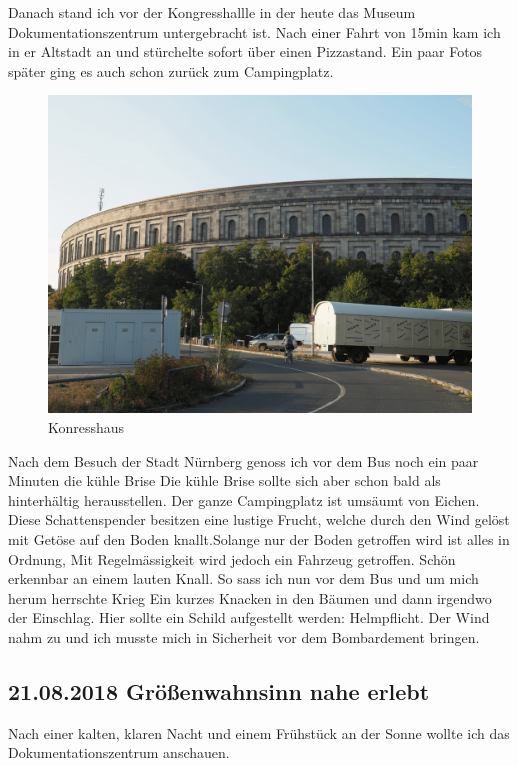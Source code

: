 \newpage

Danach stand ich vor der Kongresshallle in der heute das Museum \glqq Dokumentationszentrum\grqq{} untergebracht ist. 
Nach einer Fahrt von 15min kam ich in er Altstadt an und stürchelte sofort über einen Pizzastand.
Ein paar Fotos später ging es auch schon zurück zum Campingplatz.

\begin{figure}[h]
    \centering
    \includegraphics[width=\textwidth]{../Bilder/Sylt/65.png}
    \caption{Konresshaus}
    \label{img:Konresshaus}
\end{figure}

Nach dem Besuch der Stadt Nürnberg genoss ich vor dem Bus noch ein paar Minuten die kühle Brise
Die kühle Brise sollte sich aber schon bald als hinterhältig herausstellen.
Der ganze Campingplatz ist umsäumt von Eichen.
Diese Schattenspender besitzen eine lustige Frucht, welche durch den Wind gelöst mit Getöse auf den Boden knallt.Solange nur der Boden getroffen wird ist alles in Ordnung,
Mit Regelmässigkeit wird jedoch ein Fahrzeug getroffen.
Schön erkennbar an einem lauten Knall.
So sass ich nun vor dem Bus und um mich herum herrschte Krieg
Ein kurzes Knacken in den Bäumen und dann irgendwo der Einschlag.
Hier sollte ein Schild aufgestellt werden: Helmpflicht.
Der Wind nahm zu und ich musste mich in Sicherheit vor dem Bombardement bringen.

\newpage 

\subsection{21.08.2018 Größenwahnsinn nahe erlebt}
Nach einer kalten, klaren Nacht und einem Frühstück an der Sonne wollte ich das Dokumentationszentrum anschauen.

